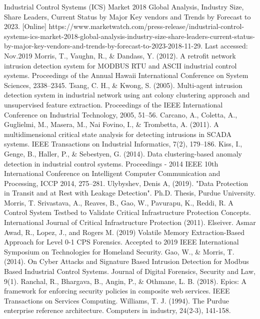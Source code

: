 \documentclass[conference]{IEEEtran}
\begin{document}
\begin{thebibliography}{00}
Industrial Control Systems (ICS) Market 2018 Global Analysis, Industry Size, Share Leaders, Current Status by Major Key vendors and Trends by Forecast to 2023. [Online] https://www.marketwatch.com/press-release/industrial-control-systems-ics-market-2018-global-analysis-industry-size-share-leaders-current-status-by-major-key-vendors-and-trends-by-forecast-to-2023-2018-11-29. Last accessed: Nov.2019
Morris, T., Vaughn, R., \& Dandass, Y. (2012). A retrofit network intrusion detection system for MODBUS RTU and ASCII industrial control systems. Proceedings of the Annual Hawaii International Conference on System Sciences, 2338–2345.
Tsang, C. H., \& Kwong, S. (2005). Multi-agent intrusion detection system in industrial network using ant colony clustering approach and unsupervised feature extraction. Proceedings of the IEEE International Conference on Industrial Technology, 2005, 51–56.
Carcano, A., Coletta, A., Guglielmi, M., Masera, M., Nai Fovino, I., \& Trombetta, A. (2011). A multidimensional critical state analysis for detecting intrusions in SCADA systems. IEEE Transactions on Industrial Informatics, 7(2), 179–186. 
Kiss, I., Genge, B., Haller, P., \& Sebestyen, G. (2014). Data clustering-based anomaly detection in industrial control systems. Proceedings - 2014 IEEE 10th International Conference on Intelligent Computer Communication and Processing, ICCP 2014, 275–281.
 Ulybyshev, Denis A, (2019). "Data Protection in Transit and at Rest with Leakage Detection". Ph.D. Thesis, Purdue University.
Morris, T. Srivastava, A., Reaves, B., Gao, W., Pavurapu, K., Reddi, R. A Control System Testbed to Validate Critical Infrastructure Protection Concepts. International Journal of Critical Infrastructure Protection (2011). Elseiver.
Asmar Awad, R., Lopez, J., and Rogers M. (2019) Volatile Memory Extraction-Based Approach for Level 0-1 CPS Forensics. Accepted to 2019 IEEE International Symposium on Technologies for Homeland Security. 
Gao, W., \& Morris, T. (2014). On Cyber Attacks and Signature Based Intrusion Detection for Modbus Based Industrial Control Systems. Journal of Digital Forensics, Security and Law, 9(1). 
Ranchal, R., Bhargava, B., Angin, P., \& Othmane, L. B. (2018). Epics: A framework for enforcing security policies in composite web services. IEEE Transactions on Services Computing.
 Williams, T. J. (1994). The Purdue enterprise reference architecture. Computers in industry, 24(2-3), 141-158.

\end{thebibliography}
\end{document}
